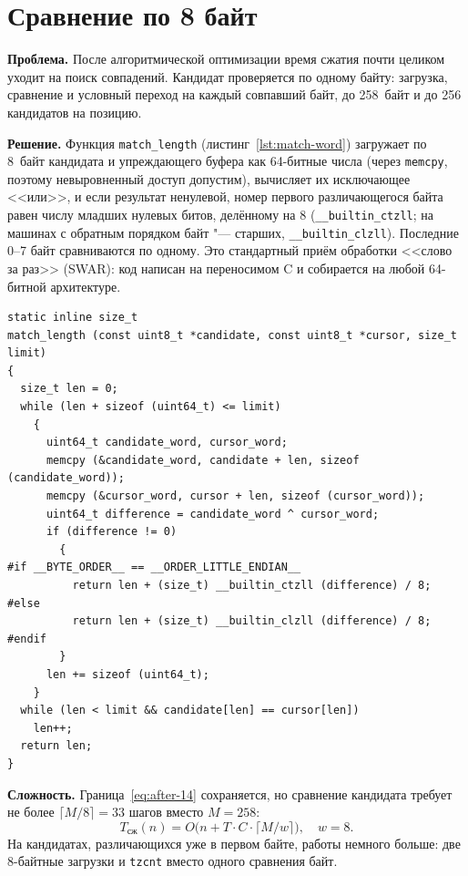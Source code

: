 
\section{Сравнение по 8 байт}
\label{sec:compare-8}

\textbf{Проблема.} После алгоритмической оптимизации время сжатия почти
целиком уходит на поиск совпадений. Кандидат проверяется по одному байту:
загрузка, сравнение и условный переход на каждый совпавший байт, до
258~байт и до 256 кандидатов на позицию.

\textbf{Решение.} Функция \texttt{match\_length} (листинг~\ref{lst:match-word})
загружает по 8~байт кандидата и упреждающего буфера как 64-битные числа
(через \texttt{memcpy}, поэтому невыровненный доступ допустим),
вычисляет их исключающее <<или>>, и если результат ненулевой, номер первого
различающегося байта равен числу младших нулевых битов, делённому на 8
(\texttt{\_\_builtin\_ctzll}; на машинах с обратным порядком байт "---
старших, \texttt{\_\_builtin\_clzll}). Последние 0--7 байт сравниваются по
одному. Это стандартный приём обработки <<слово за раз>> (SWAR): код
написан на переносимом C и собирается на любой 64-битной архитектуре.

\begin{lstlisting}[caption={Сравнение по 8 байт},label={lst:match-word}]
static inline size_t
match_length (const uint8_t *candidate, const uint8_t *cursor, size_t limit)
{
  size_t len = 0;
  while (len + sizeof (uint64_t) <= limit)
    {
      uint64_t candidate_word, cursor_word;
      memcpy (&candidate_word, candidate + len, sizeof (candidate_word));
      memcpy (&cursor_word, cursor + len, sizeof (cursor_word));
      uint64_t difference = candidate_word ^ cursor_word;
      if (difference != 0)
        {
#if __BYTE_ORDER__ == __ORDER_LITTLE_ENDIAN__
          return len + (size_t) __builtin_ctzll (difference) / 8;
#else
          return len + (size_t) __builtin_clzll (difference) / 8;
#endif
        }
      len += sizeof (uint64_t);
    }
  while (len < limit && candidate[len] == cursor[len])
    len++;
  return len;
}
\end{lstlisting}

\textbf{Сложность.} Граница~\eqref{eq:after-14} сохраняется, но сравнение
кандидата требует не более $\lceil M/8 \rceil = 33$ шагов вместо $M = 258$:
\begin{equation}
\label{eq:after-15}
T_{\text{сж}}(n) = O\bigl(n + T \cdot C \cdot \lceil M/w \rceil\bigr),
\quad w = 8.
\end{equation}
На кандидатах, различающихся уже в первом байте, работы немного больше:
две 8-байтные загрузки и \texttt{tzcnt} вместо одного сравнения байт.

